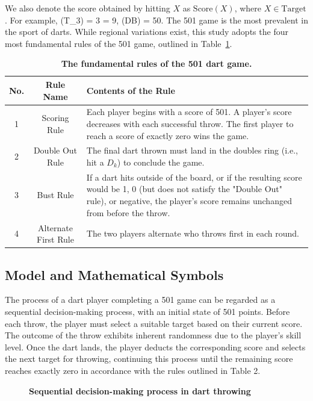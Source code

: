\documentclass[cjjs]{ipart}
\theoremstyle{plain}
\begin{document}
We also denote the score obtained by hitting \( X \) as \( \text{Score}(X) \), where \( X \in \text{Target} \).  
For example, 
(T_3) = 3  = 9, \quad {}(DB) = 50.
The 501 game is the most prevalent in the sport of darts. While regional variations exist, this study adopts the four most fundamental rules of the 501 game, outlined in Table~\ref{tab:rules}.
\begin{table}[h]
    \centering
    \begin{tabular}{|c|c|p{10cm}|}
        \hline
        No. & Rule Name & Contents of the Rule \\
        \hline
        1 & Scoring Rule & Each player begins with a score of 501. A player's score decreases with each successful throw. The first player to reach a score of exactly zero wins the game. \\
        \hline
        2 & Double Out Rule & The final dart thrown must land in the doubles ring (i.e., hit a \( D_k \)) to conclude the game. \\
        \hline
        3 & Bust Rule & If a dart hits outside of the board, or if the resulting score would be 1, 0 (but does not satisfy the "Double Out" rule), or negative, the player's score remains unchanged from before the throw. \\
        \hline
        4 & Alternate First Rule & The two players alternate who throws first in each round. \\
        \hline
     \end{tabular}
     \caption{\textbf{The fundamental rules of the 501 dart game.}}
     \label{tab:rules}
\end{table}


\subsection{Model and Mathematical Symbols}
The process of a dart player completing a 501 game can be regarded as a sequential decision-making process, with an initial state of 501 points. Before each throw, the player must select a suitable target based on their current score. The outcome of the throw exhibits inherent randomness due to the player's skill level. Once the dart lands, the player deducts the corresponding score and selects the next target for throwing, continuing this process until the remaining score reaches exactly zero in accordance with the rules outlined in Table 2.

\begin{figure}[h]
\centering
\begin{minipage}{0.45\textwidth}
    \centering
    \caption{\textbf{Sequential decision-making process in dart throwing}}
\end{minipage}
\end{figure}
\end{document}
